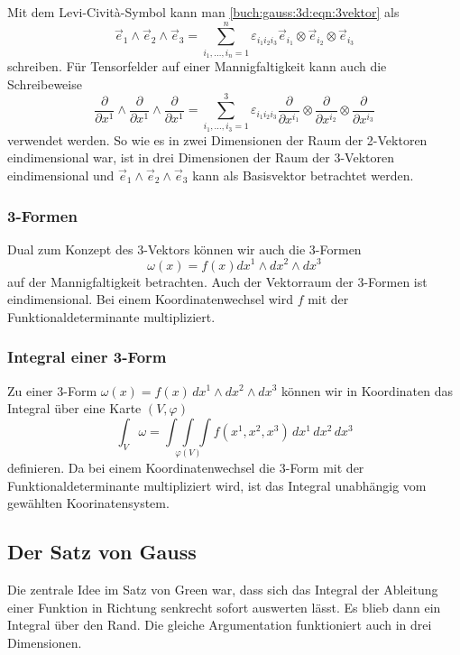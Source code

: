 Mit dem Levi-Cività-Symbol kann man 
\eqref{buch:gauss:3d:eqn:3vektor}
als
\[
\vec{e}_1
\wedge
\vec{e}_2
\wedge
\vec{e}_3
=
\sum_{i_1,\dots,i_n=1}^n
\varepsilon_{i_1 i_2 i_3}
\vec{e}_{i_1}
\otimes
\vec{e}_{i_2}
\otimes
\vec{e}_{i_3}
\]
schreiben.
Für Tensorfelder auf einer Mannigfaltigkeit kann auch die Schreibeweise
\[
\frac{\partial}{\partial x^1}
\wedge
\frac{\partial}{\partial x^1}
\wedge
\frac{\partial}{\partial x^1}
=
\sum_{i_1,\dots,i_3=1}^3
\varepsilon_{i_1 i_2 i_3}
\frac{\partial}{\partial x^{i_1}}
\otimes
\frac{\partial}{\partial x^{i_2}}
\otimes
\frac{\partial}{\partial x^{i_3}}
\]
verwendet werden.
So wie es in zwei Dimensionen der Raum der 2-Vektoren eindimensional
war, ist in drei Dimensionen der Raum der 3-Vektoren eindimensional
und $\vec{e}_1\wedge\vec{e}_2\wedge\vec{e}_3$ kann als Basisvektor
betrachtet werden.

%
%
\subsubsection{3-Formen}
Dual zum Konzept des 3-Vektors können wir auch die 3-Formen
\[
\omega(x)
=
f(x)
dx^1 \wedge dx^2 \wedge dx^3
\]
auf der Mannigfaltigkeit betrachten.
Auch der Vektorraum der 3-Formen ist eindimensional.
Bei einem Koordinatenwechsel wird $f$ mit der Funktionaldeterminante
multipliziert.

%
%
\subsubsection{Integral einer 3-Form}
Zu einer 3-Form $\omega(x)=f(x)\,dx^1\wedge dx^2\wedge dx^3$ können wir 
in Koordinaten das Integral über eine Karte $(V,\varphi)$
\[
\int_{V} \omega
=
\underset{\varphi(V)}{\displaystyle\int\!\!\!\int\!\!\!\int}
f(x^1,x^2,x^3)
\,
dx^1\,dx^2\,dx^3
\]
definieren.
Da bei einem Koordinatenwechsel die 3-Form mit der Funktionaldeterminante
multipliziert wird, ist das Integral unabhängig vom gewählten
Koorinatensystem.

%
%
\subsection{Der Satz von Gauss}

Die zentrale Idee im Satz von Green war, dass sich das Integral
der Ableitung einer Funktion in Richtung senkrecht sofort auswerten
lässt.
Es blieb dann ein Integral über den Rand.
Die gleiche Argumentation funktioniert auch in drei Dimensionen.


